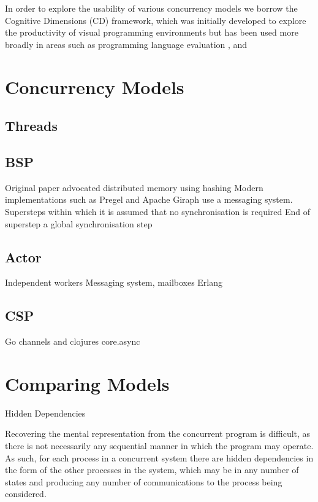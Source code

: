 \documentclass{sig-alternate}
\begin{document}
In order to explore the usability of various concurrency models we borrow the Cognitive Dimensions \cite{green89:_cognit_dimen_notat} (CD) framework, which was initially developed to explore the productivity of visual programming environments but has been used more broadly in areas such as programming language evaluation \cite{enpl}, and 

\section{Concurrency Models}
\subsection{Threads}


\subsection{BSP}
Original paper advocated distributed memory using hashing
Modern implementations such as Pregel and Apache Giraph use a messaging system.
Supersteps within which it is assumed that no synchronisation is required
End of superstep a global synchronisation step

\subsection{Actor}
Independent workers
Messaging system, mailboxes
Erlang

\subsection{CSP}
Go channels and clojures core.async

\subsection{}

\section{Comparing Models}

Hidden Dependencies

Recovering the mental representation from the concurrent program is difficult, as there is not necessarily any sequential manner in which the program may operate. As such, for each process in a concurrent system there are hidden dependencies in the form of the other processes in the system, which may be in any number of states and producing any number of communications to the process being considered.
\end{document}
